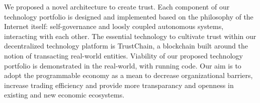 \documentclass[USenglish]{article}
\begin{document}
We proposed a novel architecture to create trust.
Each component of our technology portfolio is designed and implemented based on the philosophy of the Internet itself: self-governance and loosly coupled autonomous systems, interacting with each other.
The essential technology to cultivate trust within our decentralized technology platform is TrustChain, a blockchain built around the notion of transacting real-world entities.
Viability of our proposed technology portfolio is demonstrated in the real-world, with running code.
Our aim is to adopt the programmable economy as a mean to decrease organizational barriers, increase trading efficiency and provide more transparancy and openness in existing and new economic ecosystems.


%
\end{document}
